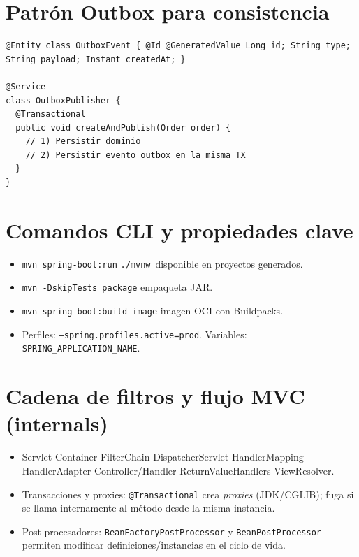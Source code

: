 \documentclass[11pt,a4paper]{article}
\begin{document}
\section{Patrón Outbox para consistencia}
\begin{lstlisting}[style=javastyle, caption={Entidad Outbox y publicador}]
@Entity class OutboxEvent { @Id @GeneratedValue Long id; String type; String payload; Instant createdAt; }

@Service
class OutboxPublisher {
  @Transactional
  public void createAndPublish(Order order) {
    // 1) Persistir dominio
    // 2) Persistir evento outbox en la misma TX
  }
}
\end{lstlisting}

\appendix
\section{Comandos CLI y propiedades clave}
\begin{itemize}[leftmargin=*]
  \item \texttt{mvn spring-boot:run} \quad \texttt{./mvnw}\, disponible en proyectos generados.
  \item \texttt{mvn -DskipTests package} \quad empaqueta JAR.
  \item \texttt{mvn spring-boot:build-image} \quad imagen OCI con Buildpacks.
  \item Perfiles: \texttt{--spring.profiles.active=prod}. Variables: \texttt{SPRING\_APPLICATION\_NAME}.
\end{itemize}

\section{Cadena de filtros y flujo MVC (internals)}
\begin{itemize}[leftmargin=*]
  \item Servlet Container \textrightarrow{} FilterChain \textrightarrow{} DispatcherServlet \textrightarrow{} HandlerMapping \textrightarrow{} HandlerAdapter \textrightarrow{} Controller/Handler \textrightarrow{} ReturnValueHandlers \textrightarrow{} ViewResolver.
  \item Transacciones y proxies: \texttt{@Transactional} crea \emph{proxies} (JDK/CGLIB); fuga si se llama internamente al método desde la misma instancia.
  \item Post-procesadores: \texttt{BeanFactoryPostProcessor} y \texttt{BeanPostProcessor} permiten modificar definiciones/instancias en el ciclo de vida.
\end{itemize}
\end{document}
